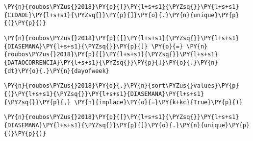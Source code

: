     \begin{tcolorbox}[breakable, size=fbox, boxrule=1pt, pad at break*=1mm,colback=cellbackground, colframe=cellborder]
\begin{Verbatim}[commandchars=\\\{\}]
\PY{n}{roubos\PYZus{}2018}\PY{p}{[}\PY{l+s+s1}{\PYZsq{}}\PY{l+s+s1}{CIDADE}\PY{l+s+s1}{\PYZsq{}}\PY{p}{]}\PY{o}{.}\PY{n}{unique}\PY{p}{(}\PY{p}{)}
\end{Verbatim}
\end{tcolorbox}

    \begin{tcolorbox}[breakable, size=fbox, boxrule=1pt, pad at break*=1mm,colback=cellbackground, colframe=cellborder]
\begin{Verbatim}[commandchars=\\\{\}]
\PY{n}{roubos\PYZus{}2018}\PY{p}{[}\PY{l+s+s1}{\PYZsq{}}\PY{l+s+s1}{DIASEMANA}\PY{l+s+s1}{\PYZsq{}}\PY{p}{]} \PY{o}{=} \PY{n}{roubos\PYZus{}2018}\PY{p}{[}\PY{l+s+s1}{\PYZsq{}}\PY{l+s+s1}{DATAOCORRENCIA}\PY{l+s+s1}{\PYZsq{}}\PY{p}{]}\PY{o}{.}\PY{n}{dt}\PY{o}{.}\PY{n}{dayofweek}
\end{Verbatim}
\end{tcolorbox}

    \begin{tcolorbox}[breakable, size=fbox, boxrule=1pt, pad at break*=1mm,colback=cellbackground, colframe=cellborder]
\begin{Verbatim}[commandchars=\\\{\}]
\PY{n}{roubos\PYZus{}2018}\PY{o}{.}\PY{n}{sort\PYZus{}values}\PY{p}{(}\PY{l+s+s1}{\PYZsq{}}\PY{l+s+s1}{DIASEMANA}\PY{l+s+s1}{\PYZsq{}}\PY{p}{,} \PY{n}{inplace}\PY{o}{=}\PY{k+kc}{True}\PY{p}{)}
\end{Verbatim}
\end{tcolorbox}

    \begin{tcolorbox}[breakable, size=fbox, boxrule=1pt, pad at break*=1mm,colback=cellbackground, colframe=cellborder]
\begin{Verbatim}[commandchars=\\\{\}]
\PY{n}{roubos\PYZus{}2018}\PY{p}{[}\PY{l+s+s1}{\PYZsq{}}\PY{l+s+s1}{DIASEMANA}\PY{l+s+s1}{\PYZsq{}}\PY{p}{]}\PY{o}{.}\PY{n}{unique}\PY{p}{(}\PY{p}{)}
\end{Verbatim}
\end{tcolorbox}

